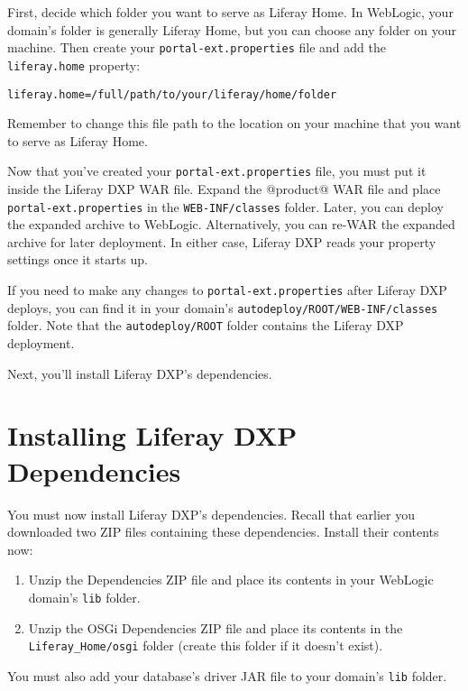 First, decide which folder you want to serve as Liferay Home. In
WebLogic, your domain's folder is generally Liferay Home, but you can
choose any folder on your machine. Then create your
\texttt{portal-ext.properties} file and add the \texttt{liferay.home}
property:

\begin{verbatim}
liferay.home=/full/path/to/your/liferay/home/folder
\end{verbatim}

Remember to change this file path to the location on your machine that
you want to serve as Liferay Home.

Now that you've created your \texttt{portal-ext.properties} file, you
must put it inside the Liferay DXP WAR file. Expand the @product@ WAR
file and place \texttt{portal-ext.properties} in the
\texttt{WEB-INF/classes} folder. Later, you can deploy the expanded
archive to WebLogic. Alternatively, you can re-WAR the expanded archive
for later deployment. In either case, Liferay DXP reads your property
settings once it starts up.

If you need to make any changes to \texttt{portal-ext.properties} after
Liferay DXP deploys, you can find it in your domain's
\texttt{autodeploy/ROOT/WEB-INF/classes} folder. Note that the
\texttt{autodeploy/ROOT} folder contains the Liferay DXP deployment.

Next, you'll install Liferay DXP's dependencies.

\section{Installing Liferay DXP
Dependencies}\label{installing-liferay-dxp-dependencies}

You must now install Liferay DXP's dependencies. Recall that earlier you
downloaded two ZIP files containing these dependencies. Install their
contents now:

\begin{enumerate}
\def\labelenumi{\arabic{enumi}.}
\item
  Unzip the Dependencies ZIP file and place its contents in your
  WebLogic domain's \texttt{lib} folder.
\item
  Unzip the OSGi Dependencies ZIP file and place its contents in the
  \texttt{Liferay\_Home/osgi} folder (create this folder if it doesn't
  exist).
\end{enumerate}

You must also add your database's driver JAR file to your domain's
\texttt{lib} folder.

